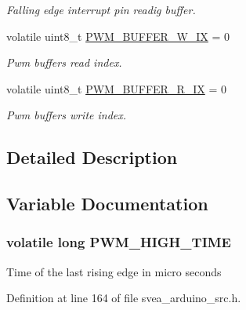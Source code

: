 \begin{DoxyCompactItemize}
\begin{DoxyCompactList}\small\item\em Falling edge interrupt pin readig buffer. \end{DoxyCompactList}\item 
volatile uint8\+\_\+t \hyperlink{group__PwmMeasurtement_ga240562bcf38322f5e5fe4498c0884a79}{P\+W\+M\+\_\+\+B\+U\+F\+F\+E\+R\+\_\+\+W\+\_\+\+IX} = 0\hypertarget{group__PwmMeasurtement_ga240562bcf38322f5e5fe4498c0884a79}{}\label{group__PwmMeasurtement_ga240562bcf38322f5e5fe4498c0884a79}

\begin{DoxyCompactList}\small\item\em Pwm buffers read index. \end{DoxyCompactList}\item 
volatile uint8\+\_\+t \hyperlink{group__PwmMeasurtement_gac0879dcb58dda890aceef95b7f4bc793}{P\+W\+M\+\_\+\+B\+U\+F\+F\+E\+R\+\_\+\+R\+\_\+\+IX} = 0\hypertarget{group__PwmMeasurtement_gac0879dcb58dda890aceef95b7f4bc793}{}\label{group__PwmMeasurtement_gac0879dcb58dda890aceef95b7f4bc793}

\begin{DoxyCompactList}\small\item\em Pwm buffers write index. \end{DoxyCompactList}\end{DoxyCompactItemize}


\subsection{Detailed Description}


\subsection{Variable Documentation}
\subsubsection[{\texorpdfstring{P\+W\+M\+\_\+\+H\+I\+G\+H\+\_\+\+T\+I\+ME}{PWM_HIGH_TIME}}]{\setlength{\rightskip}{0pt plus 5cm}volatile long P\+W\+M\+\_\+\+H\+I\+G\+H\+\_\+\+T\+I\+ME}\hypertarget{group__PwmMeasurtement_gaeb758acd90cce2a48375254eb9c2d843}{}\label{group__PwmMeasurtement_gaeb758acd90cce2a48375254eb9c2d843}
Time of the last rising edge in micro seconds 

Definition at line 164 of file svea\+\_\+arduino\+\_\+src.\+h.

